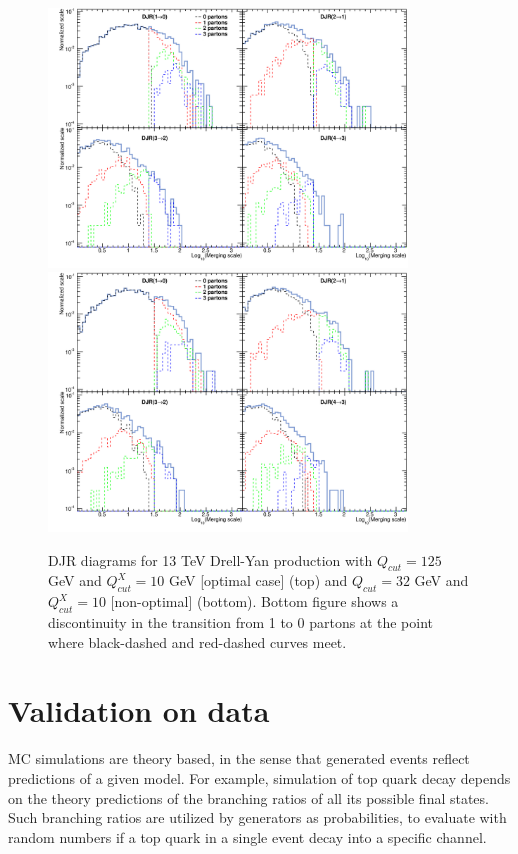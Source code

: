 \begin{figure}[!Hhtbp]
  \begin{center}
    \includegraphics[width=0.85\textwidth]{figs/DJR_q25_xq10_DYJets13TeV.png}
    \includegraphics[width=0.85\textwidth]{figs/DJR_q32_xq10_DYJets13TeV.png}
    \caption{DJR diagrams for 13 TeV Drell-Yan production with $Q_{cut}=125$ GeV and $Q^{X}_{cut}=10$ GeV [optimal case] (top) and $Q_{cut}=32$ GeV and $Q^{X}_{cut}=10$ [non-optimal] (bottom). Bottom figure shows a discontinuity in the transition from 1 to 0 partons at the point where black-dashed and red-dashed curves meet.}
    \label{fig:DYMerging}
  \end{center}
\end{figure}

\section{Validation on data}
\label{sec:val}

MC simulations are theory based, in the sense that generated events reflect predictions of a given model. For example, simulation of top quark decay depends on the theory predictions of the branching ratios of all its possible final states. Such branching ratios are utilized by generators as probabilities, to evaluate with random numbers if a top quark in a single event decay into a specific channel. 

